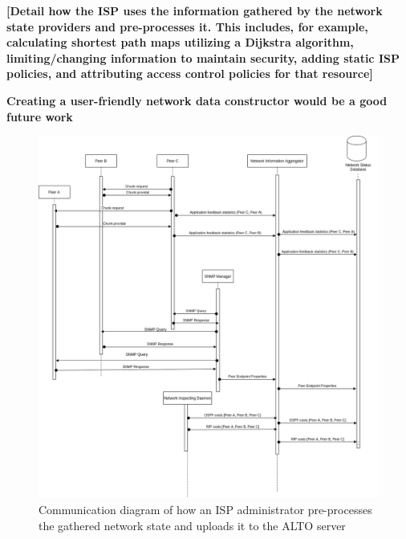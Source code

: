     \textbf{[Detail how the ISP uses the information gathered by the network state providers and pre-processes it. This includes, for example, calculating shortest path maps utilizing a Dijkstra algorithm, limiting/changing information to maintain security, adding static ISP policies, and attributing access control policies for that resource]}

    \textbf{Creating a user-friendly network data constructor would be a good future work}

\begin{figure}[H]
        \centering
        \hspace*{-2em}
        \includegraphics[scale=0.40]{img/communication-info-provisioning-isp.png}
        \caption{Communication diagram of how an ISP administrator pre-processes the gathered network state and uploads it to the ALTO server}
        \label{fig:provisioning-isp}
\end{figure}

